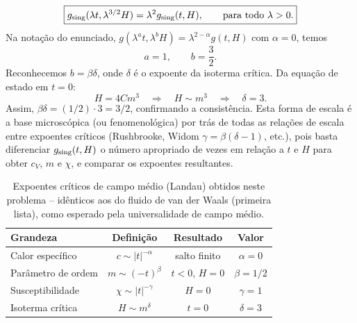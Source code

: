 \documentclass[11pt,a4paper]{article}
\begin{document}
%
\begin{equation}
    \boxed{
    g_{\rm sing}(\lambda t, \lambda^{3/2} H) = \lambda^{2} g_{\rm sing}(t, H),
    \qquad \text{para todo } \lambda > 0.
    }
\end{equation}
%
Na notação do enunciado, $g(\lambda^a t, \lambda^b H) = \lambda^{2-\alpha} g(t, H)$ com $\alpha = 0$, temos
%
\begin{equation}
    a = 1, \qquad b = \frac{3}{2}.
\end{equation}
%
Reconhecemos $b = \beta \delta$, onde $\delta$ é o expoente da isoterma crítica. Da equação de estado em $t = 0$:
%
\begin{equation}
    H = 4 C m^3 \quad \Longrightarrow \quad H \sim m^3 \quad \Longrightarrow \quad \delta = 3.
\end{equation}
%
Assim, $\beta \delta = (1/2) \cdot 3 = 3/2$, confirmando a consistência.
%
Esta forma de escala é a base microscópica (ou fenomenológica) por trás de todas as relações de escala entre expoentes críticos (Rushbrooke, Widom $\gamma = \beta(\delta - 1)$, etc.), pois basta diferenciar $g_{\rm sing}(t, H)$ o número apropriado de vezes em relação a $t$ e $H$ para obter $c_V$, $m$ e $\chi$, e comparar os expoentes resultantes.
%
\begin{table}[H]
\centering
\begin{tabular}{@{}lccc@{}}
\toprule
Grandeza & Definição & Resultado & Valor \\
\midrule
Calor específico & $c\sim|t|^{-\alpha}$ & salto finito & $\alpha=0$ \\
Parâmetro de ordem & $m\sim(-t)^{\beta}$ & $t<0,\,H=0$ & $\beta=1/2$ \\
Susceptibilidade & $\chi\sim|t|^{-\gamma}$ & $H=0$ & $\gamma=1$ \\
Isoterma crítica & $H\sim m^{\delta}$ & $t=0$ & $\delta=3$ \\
\bottomrule
\end{tabular}
\caption{Expoentes críticos de campo médio (Landau) obtidos neste problema -- idênticos aos do fluido de van der Waals (primeira lista), como esperado pela universalidade de campo médio.}
\end{table}
\end{document}
